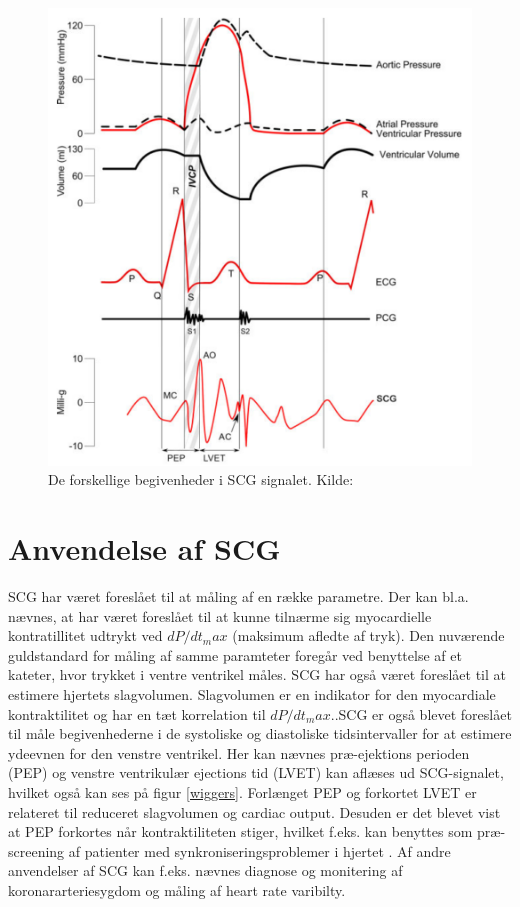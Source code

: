 \begin{figure}\label{fig:wigger}
\includegraphics[scale=1]{figures/wigger.PNG}
\caption{De forskellige begivenheder i SCG signalet. Kilde: \cite{zanetti}}
\end{figure}

\section{Anvendelse af SCG}
SCG har været foreslået til at måling af en række parametre. Der kan bl.a. nævnes, at har været foreslået til at kunne tilnærme sig myocardielle kontratillitet udtrykt ved $dP/dt_max$ (maksimum afledte af tryk). Den nuværende guldstandard for måling af samme paramteter foregår ved benyttelse af et kateter, hvor trykket i ventre ventrikel måles. SCG har også været foreslået til at estimere hjertets slagvolumen. Slagvolumen er en indikator for den myocardiale kontraktilitet og har en tæt korrelation til $dP/dt_max$..SCG er også blevet foreslået til måle begivenhederne i de systoliske og diastoliske tidsintervaller for at estimere ydeevnen for den venstre ventrikel. Her kan nævnes  præ-ejektions perioden (PEP) og venstre ventrikulær ejections tid (LVET) kan aflæses ud SCG-signalet, hvilket også kan ses på figur \ref{wiggers}. Forlænget PEP og forkortet LVET er relateret til reduceret slagvolumen og cardiac output. Desuden er det blevet vist at PEP forkortes når kontraktiliteten stiger, hvilket f.eks. kan benyttes som præ-screening af patienter med synkroniseringsproblemer i hjertet  \cite{Zanetti}  \cite{abra}. Af andre anvendelser af SCG kan f.eks. nævnes diagnose og monitering af koronararteriesygdom og måling af heart rate varibilty.


